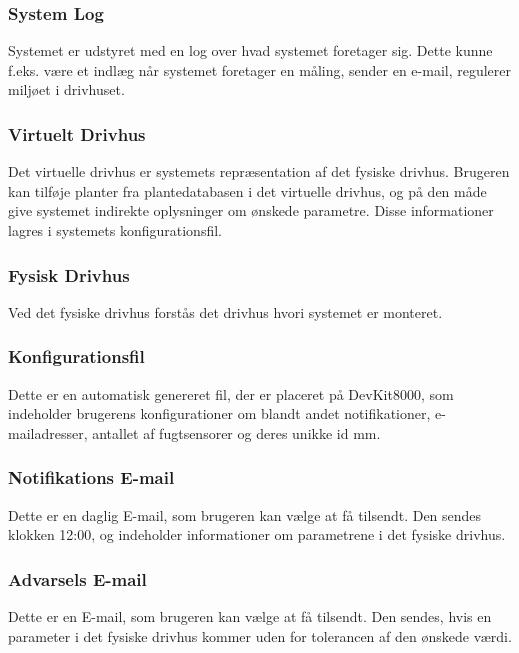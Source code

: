 \subsubsection{System Log}

Systemet er udstyret med en log over hvad systemet foretager sig. 
Dette kunne f.eks. være et indlæg når systemet foretager en måling, sender en e-mail, regulerer miljøet i drivhuset.

\subsubsection{Virtuelt Drivhus}

Det virtuelle drivhus er systemets repræsentation af det fysiske drivhus. Brugeren kan tilføje planter fra plantedatabasen i det virtuelle drivhus, og på den måde give systemet indirekte oplysninger om ønskede parametre.
Disse informationer lagres i systemets konfigurationsfil.

\subsubsection{Fysisk Drivhus}

Ved det fysiske drivhus forstås det drivhus hvori systemet er monteret.

\subsubsection{Konfigurationsfil}

Dette er en automatisk genereret fil, der er placeret på DevKit8000, som indeholder brugerens konfigurationer om blandt andet notifikationer, e-mailadresser, antallet af fugtsensorer og deres unikke id mm.

\subsubsection{Notifikations E-mail}

Dette er en daglig E-mail, som brugeren kan vælge at få tilsendt. Den sendes klokken 12:00, og indeholder informationer om parametrene i det fysiske drivhus.

\subsubsection{Advarsels E-mail}

Dette er en E-mail, som brugeren kan vælge at få tilsendt. Den sendes, hvis en parameter i det fysiske drivhus kommer uden for tolerancen af den ønskede værdi.

